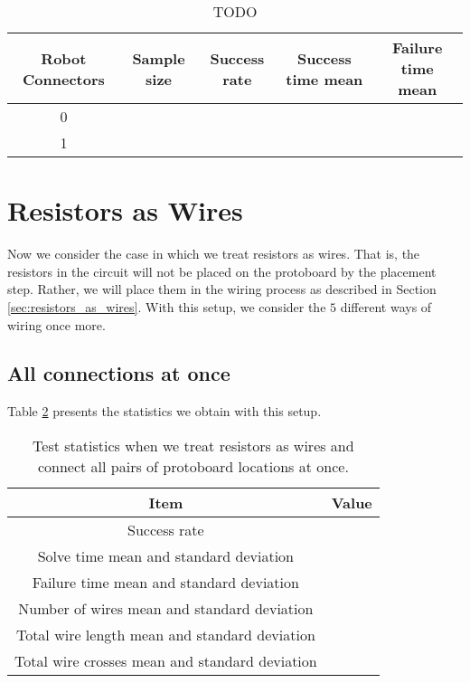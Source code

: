 \begin{table}[H]
\begin{center}
\begin{singlespace}
\begin{tabular}{| c | c | c | c | c |}
\hline
Robot Connectors & Sample size & Success rate & Success time mean &
Failure time mean\\
\hline\hline
0 & & & & \\
1 & & & & \\
\hline
\end{tabular}
\end{singlespace}
\end{center}
\label{tb:TODO}
\caption{TODO}
\end{table}

\section{Resistors as Wires}

Now we consider the case in which we treat resistors as wires. That is, the
resistors in the circuit will not be placed on the protoboard by the placement
step. Rather, we will place them in the wiring process as described in Section
\ref{sec:resistors_as_wires}. With this setup, we consider the $5$ different
ways of wiring once more.

\subsection{All connections at once}

Table \ref{tb:as_wire_all} presents the statistics we obtain with this setup.

\begin{table}[H]
\begin{center}
\begin{singlespace}
\begin{tabular}{| c | c |}
\hline
Item & Value \\
\hline\hline
Success rate & \\
Solve time mean and standard deviation & \\
Failure time mean and standard deviation & \\
Number of wires mean and standard deviation & \\
Total wire length mean and standard deviation & \\
Total wire crosses mean and standard deviation & \\
\hline
\end{tabular}
\end{singlespace}
\end{center}
\label{tb:as_wire_all}
\caption{Test statistics when we treat resistors as wires and connect all
pairs of protoboard locations at once.}
\end{table}

